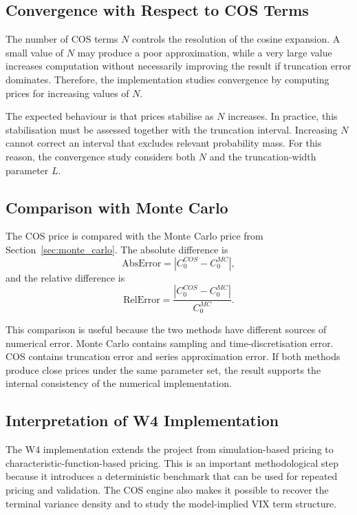 \subsection{Convergence with Respect to COS Terms}

The number of COS terms \(N\) controls the resolution of the cosine expansion. A small value of \(N\) may produce a poor approximation, while a very large value increases computation without necessarily improving the result if truncation error dominates. Therefore, the implementation studies convergence by computing prices for increasing values of \(N\).

The expected behaviour is that prices stabilise as \(N\) increases. In practice, this stabilisation must be assessed together with the truncation interval. Increasing \(N\) cannot correct an interval that excludes relevant probability mass. For this reason, the convergence study considers both \(N\) and the truncation-width parameter \(L\).

\subsection{Comparison with Monte Carlo}

The COS price is compared with the Monte Carlo price from Section~\ref{sec:monte_carlo}. The absolute difference is
\begin{equation}
\mathrm{AbsError}
=
\left|
C_0^{COS}
-
C_0^{MC}
\right|,
\end{equation}
and the relative difference is
\begin{equation}
\mathrm{RelError}
=
\frac{
\left|
C_0^{COS}
-
C_0^{MC}
\right|
}{
C_0^{MC}
}.
\end{equation}

This comparison is useful because the two methods have different sources of numerical error. Monte Carlo contains sampling and time-discretisation error. COS contains truncation error and series approximation error. If both methods produce close prices under the same parameter set, the result supports the internal consistency of the numerical implementation.

\subsection{Interpretation of W4 Implementation}

The W4 implementation extends the project from simulation-based pricing to characteristic-function-based pricing. This is an important methodological step because it introduces a deterministic benchmark that can be used for repeated pricing and validation. The COS engine also makes it possible to recover the terminal variance density and to study the model-implied VIX term structure.

